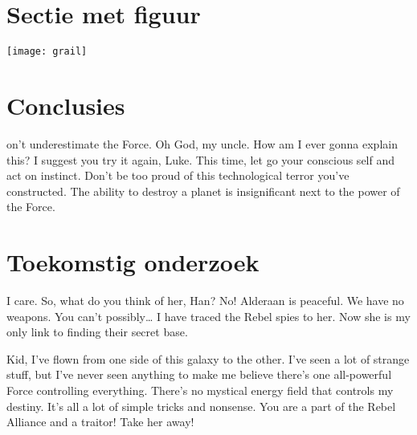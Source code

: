 \documentclass[a0,portrait]{a0poster}
\begin{document}
\begin{multicols}{2}
\color{HoGentAccent1} 
\section*{Sectie met figuur}
\color{black}


\begin{center}\vspace{1cm}
\texttt{[image: grail]}
\end{center}\vspace{1cm}




\color{HoGentAccent1} 
\section*{Conclusies}
\color{black}
on't underestimate the Force. Oh God, my uncle. How am I ever gonna explain this? I suggest you try it again, Luke. This time, let go your conscious self and act on instinct. Don't be too proud of this technological terror you've constructed. The ability to destroy a planet is insignificant next to the power of the Force.
\color{HoGentAccent1} 
\section*{Toekomstig onderzoek}
\color{black}

I care. So, what do you think of her, Han? No! Alderaan is peaceful. We have no weapons. You can't possibly… I have traced the Rebel spies to her. Now she is my only link to finding their secret base.

Kid, I've flown from one side of this galaxy to the other. I've seen a lot of strange stuff, but I've never seen anything to make me believe there's one all-powerful Force controlling everything. There's no mystical energy field that controls my destiny. It's all a lot of simple tricks and nonsense. You are a part of the Rebel Alliance and a traitor! Take her away! 



\end{multicols}
\end{document}
